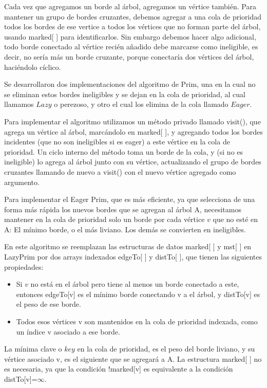 \documentclass[a4paper, 11pt]{report}
\begin{document}
Cada vez que agregamos un borde al árbol, agregamos un vértice también. Para mantener un grupo de bordes cruzantes, debemos agregar a una cola de prioridad todos los bordes de ese vertice a todos los vértices que no forman parte del árbol, usando marked[ ] para identificarlos. Sin embargo debemos hacer algo adicional, todo borde conectado al vértice recién añadido debe marcarse como ineligible, es decir, no sería más un borde cruzante, porque conectaría dos vértices del árbol, haciéndolo cíclico.

Se desarrollaron dos implementaciones del algoritmo de Prim, una en la cual no se eliminan estos bordes ineligibles y se dejan en la cola de prioridad, al cual llamamos $Lazy$ o perezoso, y otro el cual los elimina de la cola llamado $Eager$. 

Para implementar el algoritmo utilizamos un método privado llamado visit(), que agrega un vértice al árbol, marcándolo en marked[ ], y agregando todos los bordes incidentes (que no son ineligibles si es eager) a este vértice en la cola de prioridad. Un ciclo interno del método toma un borde de la cola, y (si no es ineligible) lo agrega al árbol junto con su vértice, actualizando el grupo de bordes cruzantes llamando de nuevo a visit() con el nuevo vértice agregado como argumento. 

Para implementar el Eager Prim, que es más eficiente, ya que selecciona de una forma más rápida los nuevos bordes que se agregan al árbol A, necesitamos mantener en la cola de prioridad solo un borde por cada vértice $v$ que no esté en A: El mínimo borde, o el más liviano. Los demás se convierten en ineligibles.

En este algoritmo se reemplazan las estructuras de datos marked[ ] y mst[ ] en LazyPrim por dos arrays indexados edgeTo[ ] y distTo[ ], que tienen las siguientes propiedades:

\begin{itemize}
\item Si $v$ no está en el árbol pero tiene al menos un borde conectado a este, entonces edgeTo[v] es el mínimo borde conectando v a el árbol, y distTo[v] es el peso de ese borde.
\item Todos esos vértices v son mantenidos en la cola de prioridad indexada, como un índice v asociado a ese borde.
\end{itemize} 
La mínima clave o $key$ en la cola de prioridad, es el peso del borde liviano, y su vértice asociado v, es el siguiente que se agregará a A. La estructura marked[ ] no es necesaria, ya que la condición !marked[v] es equivalente a la condición distTo[v]=$\infty$.   
\end{document}
